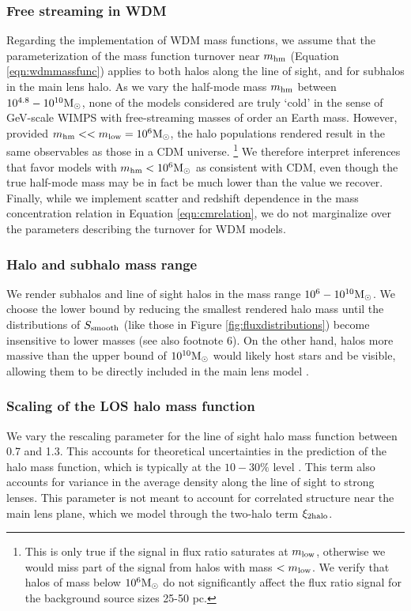 \subsubsection{Free streaming in WDM}
Regarding the implementation of WDM mass functions, we assume that the parameterization of the mass function turnover near ${m_{\rm{hm}}}$ (Equation \ref{eqn:wdmmassfunc}) applies to both halos along the line of sight, and for subhalos in the main lens halo. As we vary the half-mode mass ${m_{\rm{hm}}}$ between $10^{4.8} - 10^{10} {\rm{M}_{\odot}}$, none of the models considered are truly `cold' in the sense of GeV-scale WIMPS with free-streaming masses of order an Earth mass. However, provided ${m_{\rm{hm}}} << m_{\rm{low}} = 10^6 {\rm{M}_{\odot}}$, the halo populations rendered result in the same observables as those in a CDM universe. \footnote{This is only true if the signal in flux ratio saturates at $m_{\rm{low}}$, otherwise we would miss part of the signal from halos with mass $<m_{\rm{low}}$. We verify that halos of mass below $10^6 {\rm{M}_{\odot}}$ do not significantly affect the flux ratio signal for the background source sizes 25-50 pc.} We therefore interpret inferences that favor models with ${m_{\rm{hm}}} <  10^6 {\rm{M}_{\odot}}$ as consistent with CDM, even though the true half-mode mass may be in fact be much lower than the value we recover. Finally, while we implement scatter and redshift dependence in the mass concentration relation in Equation \ref{eqn:cmrelation}, we do not marginalize over the parameters describing the turnover for WDM models. 

\subsubsection{Halo and subhalo mass range}
We render subhalos and line of sight halos in the mass range $10^6 - 10^{10} {\rm{M}_{\odot}}$. We choose the lower bound by reducing the smallest rendered halo mass until the distributions of $S_{\rm{smooth}}$ (like those in Figure \ref{fig:fluxdistributions}) become insensitive to lower masses (see also footnote 6). On the other hand, halos more massive than the upper bound of $10^{10} {\rm{M}_{\odot}}$ would likely host stars and be visible, allowing them to be directly included in the main lens model \citep[e.g.][]{Birrer++19}.

\subsubsection{Scaling of the LOS halo mass function}
We vary the rescaling parameter for the line of sight halo mass function between 0.7 and 1.3. This accounts for theoretical uncertainties in the prediction of the halo mass function, which is typically at the $10-30 \%$ level \citep{Despali++16}. This term also accounts for variance in the average density along the line of sight to strong lenses. This parameter is not meant to account for correlated structure near the main lens plane, which we model through the two-halo term $\xi_{\rm{2halo}}$.

